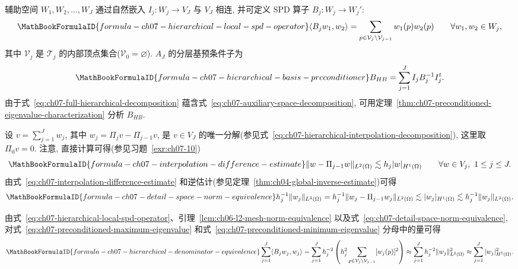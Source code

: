 辅助空间 $W_1,W_2,\ldots,W_J$ 通过自然嵌入 $I_j:W_j\longrightarrow V_J$ 与 $V_J$ 相连, 并可定义 SPD 算子 $B_j:W_j\longrightarrow W_j'$:
\begin{equation}
\MathBookFormulaID{formula-ch07-hierarchical-local-spd-operator}
\label{eq:ch07-hierarchical-local-spd-operator}
\langle B_jw_1,w_2\rangle
=\sum_{p\in\mathcal V_j\setminus\mathcal V_{j-1}}w_1(p)w_2(p)
\qquad\forall w_1,w_2\in W_j,
\end{equation}
其中 $\mathcal V_j$ 是 $\mathcal T_j$ 的内部顶点集合($\mathcal V_0=\varnothing$). $A_J$ 的分层基预条件子为
\begin{equation}
\MathBookFormulaID{formula-ch07-hierarchical-basis-preconditioner}
\label{eq:ch07-hierarchical-basis-preconditioner}
B_{HB}=\sum_{j=1}^{J}I_jB_j^{-1}I_j^t.
\end{equation}
由于式~\eqref{eq:ch07-full-hierarchical-decomposition} 蕴含式~\eqref{eq:ch07-auxiliary-space-decomposition}, 可用定理~\ref{thm:ch07-preconditioned-eigenvalue-characterization} 分析 $B_{HB}$.

设 $v=\sum_{j=1}^{J}w_j$, 其中 $w_j=\Pi_jv-\Pi_{j-1}v$, 是 $v\in V_J$ 的唯一分解(参见式~\eqref{eq:ch07-hierarchical-interpolation-decomposition}), 这里取 $\Pi_0v=0$. 注意, 直接计算可得(参见习题~\ref{exr:ch07-10})
\begin{equation}
\MathBookFormulaID{formula-ch07-interpolation-difference-estimate}
\label{eq:ch07-interpolation-difference-estimate}
\|w-\Pi_{j-1}w\|_{L^2(\Omega)}
\lesssim h_j|w|_{H^1(\Omega)}
\qquad\forall w\in V_j,\ 1\leq j\leq J.
\end{equation}
由式~\eqref{eq:ch07-interpolation-difference-estimate} 和逆估计(参见定理~\ref{thm:ch04-global-inverse-estimate})可得
\begin{equation}
\MathBookFormulaID{formula-ch07-detail-space-norm-equivalence}
\label{eq:ch07-detail-space-norm-equivalence}
h_j^{-1}\|w_j\|_{L^2(\Omega)}
=h_j^{-1}\|w_j-\Pi_{j-1}w_j\|_{L^2(\Omega)}
\lesssim|w_j|_{H^1(\Omega)}
\lesssim h_j^{-1}\|w_j\|_{L^2(\Omega)}.
\end{equation}

由式~\eqref{eq:ch07-hierarchical-local-spd-operator}、引理~\ref{lem:ch06-l2-mesh-norm-equivalence} 以及式~\eqref{eq:ch07-detail-space-norm-equivalence}, 对式~\eqref{eq:ch07-preconditioned-maximum-eigenvalue} 和式~\eqref{eq:ch07-preconditioned-minimum-eigenvalue} 分母中的量可得
\begin{equation}
\MathBookFormulaID{formula-ch07-hierarchical-denominator-equivalence}
\label{eq:ch07-hierarchical-denominator-equivalence}
\sum_{j=1}^{J}\langle B_jw_j,w_j\rangle
=\sum_{j=1}^{J}h_j^{-2}
\left(h_j^2\sum_{p\in\mathcal V_j\setminus\mathcal V_{j-1}}[w_j(p)]^2\right)
\approx\sum_{j=1}^{J}h_j^{-2}\|w_j\|_{L^2(\Omega)}^2
\approx\sum_{j=1}^{J}|w_j|_{H^1(\Omega)}^2.
\end{equation}

